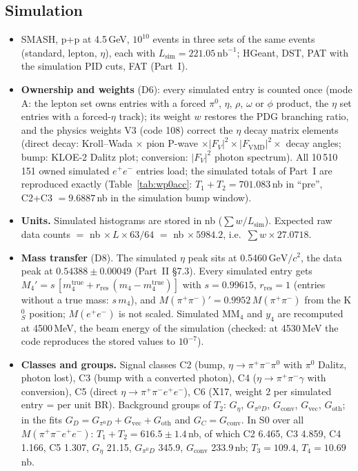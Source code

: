 \documentclass[11pt,a4paper]{article}
\newcommand{\piz}{\ensuremath{\pi^{0}}\xspace}
\newcommand{\ee}{\ensuremath{e^{+}e^{-}}\xspace}
\newcommand{\pipi}{\ensuremath{\pi^{+}\pi^{-}}\xspace}
\newcommand{\ppee}{\ensuremath{\pi^{+}\pi^{-}e^{+}e^{-}}\xspace}
\newcommand{\Mfour}{\ensuremath{M(\pi^{+}\pi^{-}e^{+}e^{-})}\xspace}
\newcommand{\Mee}{\ensuremath{M(e^{+}e^{-})}\xspace}
\newcommand{\Mpipi}{\ensuremath{M(\pi^{+}\pi^{-})}\xspace}
\newcommand{\nbinv}{\ensuremath{\mathrm{nb}^{-1}}\xspace}
\newcommand{\GeVcc}{\ensuremath{\mathrm{GeV}/c^{2}}\xspace}
\newcommand{\MMfour}{\ensuremath{\mathrm{MM}_4}\xspace}
\newcommand{\Lsim}{\ensuremath{L_{\mathrm{sim}}}\xspace}
\newcommand{\Geta}{\ensuremath{G_\eta}\xspace}
\begin{document}
\subsection{Simulation}
\label{sec:simin}
\begin{itemize}\setlength{\itemsep}{0pt}
\item SMASH, p+p at 4.5\,GeV, $10^{10}$ events in three sets of the same events (standard, lepton, $\eta$), each with
      $\Lsim=221.05\,\nbinv$; HGeant, DST, PAT with the simulation PID cuts, FAT (Part~I).
\item \textbf{Ownership and weights} (D6): every simulated entry is counted once (mode A: the lepton set owns entries with a forced \piz, $\eta$,
      $\rho$, $\omega$ or $\phi$ product, the $\eta$ set entries with a forced-$\eta$ track); its weight $w$ restores the PDG branching
      ratio, and the physics weights V3 (code 108) correct the $\eta$ decay matrix elements (direct decay: Kroll--Wada $\times$
      pion P-wave $\times|F_V|^2\times|F_{\mathrm{VMD}}|^2\times$ decay angles; bump: KLOE-2 Dalitz plot; conversion: $|F_V|^2$ photon
      spectrum). All 10\,510\,151 owned simulated \ee entries load; the simulated totals of Part~I are reproduced exactly
      (Table~\ref{tab:wp0acc}: $T_1+T_2=701.083$\,nb in ``pre'', C2+C3 $=9.6887$\,nb in the simulation bump window).
\item \textbf{Units.} Simulated histograms are stored in nb ($\sum w/\Lsim$). Expected raw data counts $=$ nb $\times\,L\times63/64$
      $=$ nb $\times\,5984.2$, i.e.\ $\sum w\times27.0718$.
\item \textbf{Mass transfer} (D8). The simulated $\eta$ peak sits at 0.5460\,\GeVcc, the data peak at $0.54388\pm0.00049$
      (Part~II \S7.3). Every simulated entry gets $M_4'=s\,[m_4^{\mathrm{true}}+r_{\mathrm{res}}\,(m_4-m_4^{\mathrm{true}})]$ with $s=0.99615$, $r_{\mathrm{res}}=1$
      (entries without a true mass: $s\,m_4$), and $\Mpipi'=0.9952\,\Mpipi$ from the K$^0_S$ position; \Mee is not scaled. Simulated
      \MMfour and $y_4$ are recomputed at 4500\,MeV, the beam energy of the simulation (checked: at 4530\,MeV the code reproduces the stored
      values to $10^{-7}$).
\item \textbf{Classes and groups.} Signal classes C2 (bump, $\eta\to\pipi\piz$ with \piz Dalitz, photon lost), C3 (bump with a
      converted photon), C4 ($\eta\to\pipi\gamma$ with conversion), C5 (direct $\eta\to\ppee$), C6 (X17, weight 2 per simulated entry = per unit BR).
      Background groups of $T_2$: \Geta, $G_{\pi^0D}$, $G_{\mathrm{conv}}$, $G_{\mathrm{vec}}$, $G_{\mathrm{oth}}$; in the fits
      $G_D=G_{\pi^0D}+G_{\mathrm{vec}}+G_{\mathrm{oth}}$ and $G_C=G_{\mathrm{conv}}$. In S0 over all \Mfour:
      $T_1+T_2=616.5\pm1.4$\,nb, of which C2 6.465, C3 4.859, C4 1.166, C5 1.307, \Geta 21.15, $G_{\pi^0D}$ 345.9, $G_{\mathrm{conv}}$
      233.9\,nb; $T_3=109.4$, $T_4=10.69$\,nb.
\end{itemize}
\end{document}
